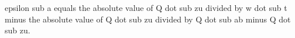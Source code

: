 epsilon sub a equals the absolute value of Q dot sub zu divided by w dot sub t minus the absolute value of Q dot sub zu divided by Q dot sub ab minus Q dot sub zu.